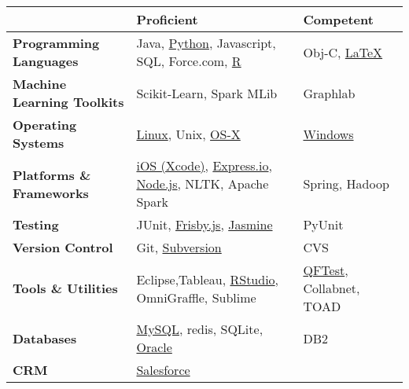 \begin{table*}[h]
    \begin{tabular}{|lll|}
        \hline \bfseries  & \bfseries Proficient & \bfseries Competent \\\hline 
        \hline \bfseries Programming Languages & Java, \href{http://www.greenteapress.com/thinkpython/html/index.html}{Python}, Javascript, SQL, Force.com,  \href{http://www.mathworks.com/}{R}  &  Obj-C, \href{http://www.latex-project.org/}{\LaTeX}   \\
         \hline \bfseries Machine Learning Toolkits & Scikit-Learn, Spark MLib &  Graphlab  \\
        \hline \bfseries Operating Systems &  \href{http://www.linux.org/}{Linux}, Unix, \href{https://developer.apple.com/}{OS-X}  & \href{http://windows.microsoft.com/en-us/windows/home}{Windows}  \\
        \hline \bfseries Platforms \& Frameworks & \href{https://developer.apple.com/devcenter/ios/index.action}{iOS (Xcode)}, \href{http://express-io.org/}{Express.io}, \href{http://nodejs.org/}{Node.js}, NLTK, Apache Spark & Spring, Hadoop \\
        \hline \bfseries Testing &  JUnit,  \href{http://frisbyjs.com/}{Frisby.js}, \href{https://github.com/pivotal/jasmine}{Jasmine}&PyUnit\\
        \hline \bfseries Version Control & {Git}, \href{http://subversion.apache.org/}{Subversion}  & CVS\\
        \hline \bfseries Tools \& Utilities & Eclipse,Tableau, \href{https://www.rstudio.com/}{RStudio}, OmniGraffle, Sublime &\href{http://www.qfs.de/en/qftest/} {QFTest}, Collabnet, TOAD \\
        \hline \bfseries Databases & \href{http://www.mysql.com/}{MySQL}, redis, SQLite, \href{http://www.oracle.com/}{Oracle} & DB2 \\
         \hline \bfseries CRM & \href{http://www.salesforce.com/}{Salesforce} &\\
        \hline 
     \end{tabular}
   \end{table*}


